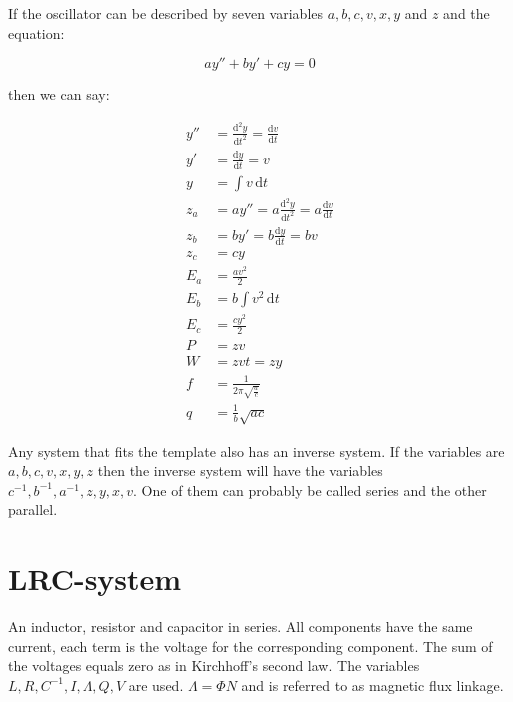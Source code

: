 \documentclass[]{../common/elementary-physics}
\begin{document}
If the oscillator can be described by seven variables $a,b,c,v,x,y$ and $z$ and the equation:

\begin{equation}
a y'' + b y' + c y = 0
\end{equation}

then we can say:

\begin{subequations}
\begin{align}
y'' &= \frac{\mathrm{d}^2 y}{\mathrm{d}t^2} = \frac{\mathrm{d}v}{\mathrm{d}t} \\
y' &= \frac{\mathrm{d}y}{\mathrm{d}t} = v \\
y &= \int v \, \mathrm{d}t \\
z_a &= a y'' = a \frac{\mathrm{d}^2 y}{\mathrm{d}t^2} = a \frac{\mathrm{d}v}{\mathrm{d}t} \\
z_b &= b y' = b \frac{\mathrm{d}y}{\mathrm{d}t} = b v \\
z_c &= c y \\
E_a &= \frac{a v^2}{2} \tag{energy} \\
E_b &= b \int v^2 \, \mathrm{d}t \tag{losses} \\
E_c &= \frac{c y^2}{2} \tag{energy} \\
P &= z v \tag{power} \\
W &= z v t = z y \tag{work} \\
f &= \frac{1}{2 \pi \sqrt{\frac{a}{c}}} \tag{frequency} \\
q &= \frac{1}{b} \sqrt{a c} \tag{quality factor}
\end{align}
\end{subequations}

Any system that fits the template also has an inverse system.
If the variables are $a,b,c,v,x,y,z$ then the inverse system will have the variables $c^{-1},b^{-1},a^{-1},z,y,x,v$.
One of them can probably be called series and the other parallel.

\pagebreak

\section{LRC-system}

An inductor, resistor and capacitor in series.
All components have the same current, each term is the voltage for the corresponding component.
The sum of the voltages equals zero as in Kirchhoff's second law.
The variables $L,R,C^{-1},I,\Lambda,Q,V$ are used.
$\Lambda = \Phi N$ and is referred to as magnetic flux linkage.
\end{document}
